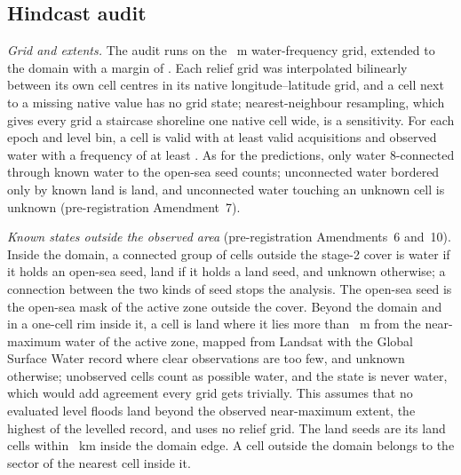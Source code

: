 
\subsection*{Hindcast audit}
\emph{Grid and extents.} The audit runs on the ~m water-frequency grid, extended to the domain with a margin of \textdegree{}. Each relief grid was interpolated bilinearly between its own cell centres in its native longitude--latitude grid, and a cell next to a missing native value has no grid state; nearest-neighbour resampling, which gives every grid a staircase shoreline one native cell wide, is a sensitivity. For each epoch and level bin, a cell is valid with at least  valid acquisitions and observed water with a frequency of at least . As for the predictions, only water 8-connected through known water to the open-sea seed counts; unconnected water bordered only by known land is land, and unconnected water touching an unknown cell is unknown (pre-registration Amendment~7).

\emph{Known states outside the observed area} (pre-registration Amendments~6 and~10). Inside the domain, a connected group of cells outside the stage-2 cover is water if it holds an open-sea seed, land if it holds a land seed, and unknown otherwise; a connection between the two kinds of seed stops the analysis. The open-sea seed is the open-sea mask of the active zone outside the cover. Beyond the domain and in a one-cell rim inside it, a cell is land where it lies more than ~m from the  near-maximum water of the active zone, mapped from Landsat with the Global Surface Water record where clear observations are too few\citep{pekel2016}, and unknown otherwise; unobserved cells count as possible water, and the state is never water, which would add agreement every grid gets trivially. This assumes that no evaluated level floods land beyond the observed near-maximum extent, the highest of the levelled record, and uses no relief grid. The land seeds are its land cells within ~km inside the domain edge. A cell outside the domain belongs to the sector of the nearest cell inside it.

